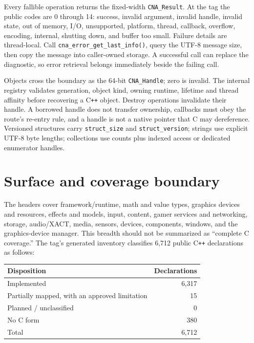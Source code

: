 Every fallible operation returns the fixed-width \texttt{CNA\_Result}. At the tag the public
codes are 0 through 14: success, invalid argument, invalid handle, invalid state, out of memory,
I/O, unsupported, platform, thread, callback, overflow, encoding, internal, shutting down, and
buffer too small. Failure details are thread-local. Call
\texttt{cna\_error\_get\_last\_info()}, query the UTF-8 message size, then copy the message into
caller-owned storage. A successful call can replace the diagnostic, so error retrieval belongs
immediately beside the failing call.

Objects cross the boundary as the 64-bit \texttt{CNA\_Handle}; zero is invalid. The internal
registry validates generation, object kind, owning runtime, lifetime and thread affinity before
recovering a C\texttt{++} object. Destroy operations invalidate their handle. A borrowed handle
does not transfer ownership, callbacks must obey the route's re-entry rule, and a handle is not a
native pointer that C may dereference. Versioned structures carry \texttt{struct\_size} and
\texttt{struct\_version}; strings use explicit UTF-8 byte lengths; collections use counts plus
indexed access or dedicated enumerator handles.

\section{Surface and coverage boundary}

The headers cover framework/runtime, math and value types, graphics devices and resources,
effects and models, input, content, gamer services and networking, storage, audio/XACT, media,
sensors, devices, components, windows, and the graphics-device manager. This breadth should not
be summarized as ``complete C coverage.'' The tag's generated inventory classifies 6,712 public
C\texttt{++} declarations as follows:

\begin{center}
\small
\begin{tabular}{lr}
\toprule
\textbf{Disposition} & \textbf{Declarations} \\
\midrule
Implemented & 6,317 \\
Partially mapped, with an approved limitation & 15 \\
Planned / unclassified & 0 \\
No C form & 380 \\
\midrule
Total & 6,712 \\
\bottomrule
\end{tabular}
\end{center}


